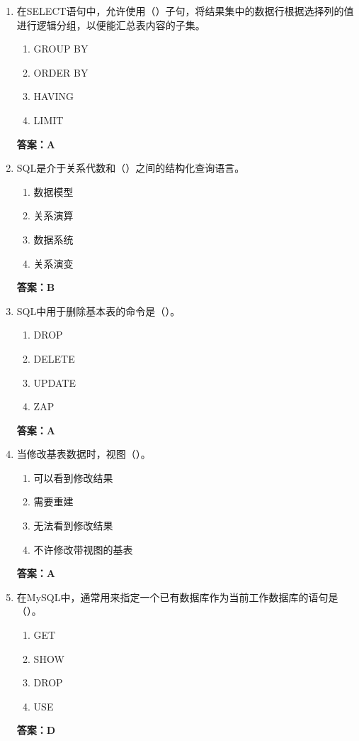 \documentclass[12pt, a4paper]{article}
\begin{document}
\begin{enumerate}[label=\arabic*.]
	\item 在SELECT语句中，允许使用（\quad）子句，将结果集中的数据行根据选择列的值进行逻辑分组，以便能汇总表内容的子集。
	      \begin{enumerate}
		      \item GROUP BY
		      \item ORDER BY
		      \item HAVING
		      \item LIMIT
	      \end{enumerate}
	      \textbf{答案：A}

	\item SQL是介于关系代数和（\quad）之间的结构化查询语言。
	      \begin{enumerate}
		      \item 数据模型
		      \item 关系演算
		      \item 数据系统
		      \item 关系演变
	      \end{enumerate}
	      \textbf{答案：B}

	\item SQL中用于删除基本表的命令是（\quad）。
	      \begin{enumerate}
		      \item DROP
		      \item DELETE
		      \item UPDATE
		      \item ZAP
	      \end{enumerate}
	      \textbf{答案：A}

	\item 当修改基表数据时，视图（\quad）。
	      \begin{enumerate}
		      \item 可以看到修改结果
		      \item 需要重建
		      \item 无法看到修改结果
		      \item 不许修改带视图的基表
	      \end{enumerate}
	      \textbf{答案：A}

	\item 在MySQL中，通常用来指定一个已有数据库作为当前工作数据库的语句是（\quad）。
	      \begin{enumerate}
		      \item GET
		      \item SHOW
		      \item DROP
		      \item USE
	      \end{enumerate}
	      \textbf{答案：D}


\end{enumerate}
\end{document}
